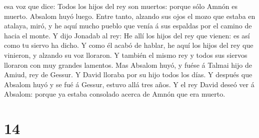 esa voz que dice: Todos los hijos del rey son muertos: porque sólo Amnón
es muerto.  Absalom huyó luego. Entre tanto, alzando sus
ojos el mozo que estaba en atalaya, miró, y he aquí mucho pueblo que
venía á sus espaldas por el camino de hacia el monte.  Y
dijo Jonadab al rey: He allí los hijos del rey que vienen: es así como
tu siervo ha dicho.  Y como él acabó de hablar, he aquí los
hijos del rey que vinieron, y alzando su voz lloraron. Y también el
mismo rey y todos sus siervos lloraron con muy grandes lamentos.
 Mas Absalom huyó, y fuése á Talmai hijo de Amiud, rey de
Gessur. Y David lloraba por su hijo todos los días.  Y
después que Absalom huyó y se fué á Gessur, estuvo allá tres años.
 Y el rey David deseó ver á Absalom: porque ya estaba
consolado acerca de Amnón que era muerto.

\hypertarget{section-13}{%
\section{14}\label{section-13}}

